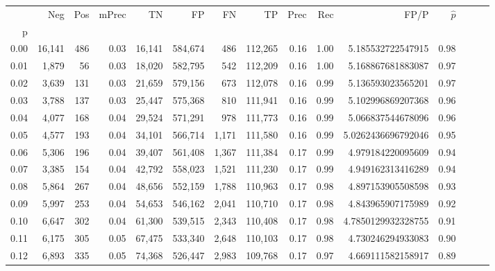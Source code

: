 \begin{tabular}{rrrrrrrrrrrrrrr}
\toprule
{} &     Neg &    Pos & mPrec &       TN &       FP &       FN &       TP &  Prec &   Rec &                  FP/P & $\hat{p}$ \\
p    &         &        &       &          &          &          &          &       &       &                       &           \\
\midrule
0.00 &  16,141 &    486 &  0.03 &   16,141 &  584,674 &      486 &  112,265 &  0.16 &  1.00 &     5.185532722547915 &      0.98 \\
0.01 &   1,879 &     56 &  0.03 &   18,020 &  582,795 &      542 &  112,209 &  0.16 &  1.00 &     5.168867681883087 &      0.97 \\
0.02 &   3,639 &    131 &  0.03 &   21,659 &  579,156 &      673 &  112,078 &  0.16 &  0.99 &     5.136593023565201 &      0.97 \\
0.03 &   3,788 &    137 &  0.03 &   25,447 &  575,368 &      810 &  111,941 &  0.16 &  0.99 &     5.102996869207368 &      0.96 \\
0.04 &   4,077 &    168 &  0.04 &   29,524 &  571,291 &      978 &  111,773 &  0.16 &  0.99 &     5.066837544678096 &      0.96 \\
0.05 &   4,577 &    193 &  0.04 &   34,101 &  566,714 &    1,171 &  111,580 &  0.16 &  0.99 &    5.0262436696792046 &      0.95 \\
0.06 &   5,306 &    196 &  0.04 &   39,407 &  561,408 &    1,367 &  111,384 &  0.17 &  0.99 &     4.979184220095609 &      0.94 \\
0.07 &   3,385 &    154 &  0.04 &   42,792 &  558,023 &    1,521 &  111,230 &  0.17 &  0.99 &     4.949162313416289 &      0.94 \\
0.08 &   5,864 &    267 &  0.04 &   48,656 &  552,159 &    1,788 &  110,963 &  0.17 &  0.98 &     4.897153905508598 &      0.93 \\
0.09 &   5,997 &    253 &  0.04 &   54,653 &  546,162 &    2,041 &  110,710 &  0.17 &  0.98 &     4.843965907175989 &      0.92 \\
0.10 &   6,647 &    302 &  0.04 &   61,300 &  539,515 &    2,343 &  110,408 &  0.17 &  0.98 &    4.7850129932328755 &      0.91 \\
0.11 &   6,175 &    305 &  0.05 &   67,475 &  533,340 &    2,648 &  110,103 &  0.17 &  0.98 &     4.730246294933083 &      0.90 \\
0.12 &   6,893 &    335 &  0.05 &   74,368 &  526,447 &    2,983 &  109,768 &  0.17 &  0.97 &     4.669111582158917 &      0.89 \\

\end{tabular}
